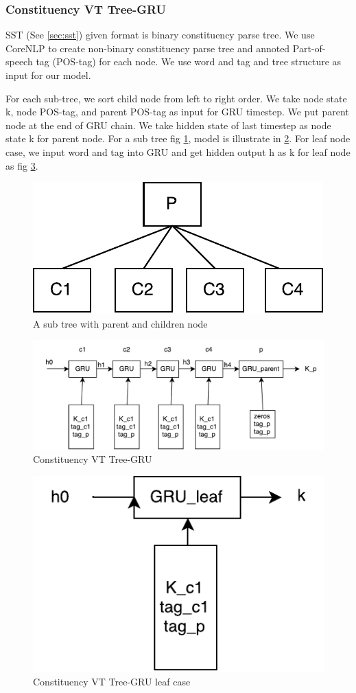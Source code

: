 \subsubsection{Constituency VT Tree-GRU} \label{sec:VTtreeConstituency}
SST (See \ref{sec:sst}) given format is binary constituency parse tree. We use CoreNLP \cite{manning2014stanford} to create non-binary constituency parse tree and annoted Part-of-speech tag (POS-tag) for each node. We use word and tag and tree structure as input for our model.

For each sub-tree, we sort child node from left to right order. We take node state k, node POS-tag, and parent POS-tag as input for GRU timestep. We put parent node at the end of GRU chain. We take hidden state of last timestep as node state k for parent node. For a sub tree fig \ref{fig:treecp}, model is illustrate in \ref{fig:cvtgru}. For leaf node case, we input word and tag into GRU and get hidden output h as k for leaf node as fig \ref{fig:gruleaf}.
\begin{figure}[H]
	\centering
	\includegraphics[width=0.5\linewidth]{figure/treecp}
	\caption[A sub tree with parent and children node]{A sub tree with parent and children node}
	\label{fig:treecp}
\end{figure}

\begin{figure}[H]
	\centering
	\includegraphics[width=0.9\linewidth]{figure/cvtgru}
	\caption[Constituency VT Tree-GRU]{Constituency VT Tree-GRU}
	\label{fig:cvtgru}
\end{figure}

\begin{figure}[H]
	\centering
	\includegraphics[width=0.4\linewidth]{figure/gruleaf}
	\caption[Constituency VT Tree-GRU leaf case]{Constituency VT Tree-GRU leaf case}
	\label{fig:gruleaf}
\end{figure}




